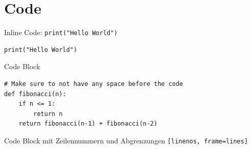 \section{Code}

Inline Code: \texttt{print("Hello World")}

\begin{listing}[ht]
	\begin{center}
		\begin{verbatim}
print("Hello World")
        \end{verbatim}
	\end{center}
	\caption{Code Block}
	\label{fig:code-block}
\end{listing}

\begin{listing}[ht]
	\begin{center}
		\begin{verbatim}
# Make sure to not have any space before the code
def fibonacci(n):
    if n <= 1:
        return n
    return fibonacci(n-1) + fibonacci(n-2)
        \end{verbatim}
	\end{center}
	\caption{Code Block mit Zeilennummern und Abgrenzungen \texttt{[linenos, frame=lines]}}
\end{listing}


